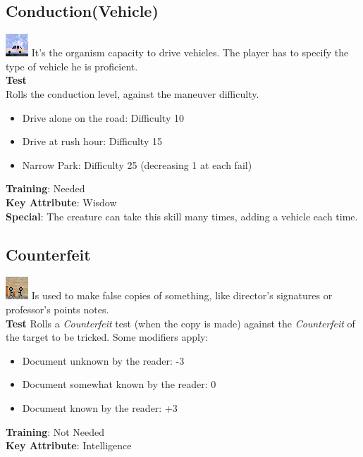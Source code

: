 \documentclass[ letterpaper,12pt]{article}
\begin{document}
\subsection{Conduction(Vehicle)}
\includegraphics{../data/skills/Img/conducao.png}
It's the organism capacity to drive vehicles. The player has to specify the type of vehicle he is proficient.\\
{\bf Test}\\
Rolls the conduction level, against the maneuver difficulty.\\
\begin{itemize}
\item{Drive alone on the road: Difficulty 10}
\item{Drive at rush hour: Difficulty 15}
\item{Narrow Park: Difficulty 25 (decreasing 1 at each fail)}
\end{itemize}
{\bf Training}: Needed\\
{\bf Key Attribute}: Wisdow\\
{\bf Special}: The creature can take this skill many times, adding a vehicle each time.

\subsection{Counterfeit}
\includegraphics{../data/skills/Img/falsificar.png}
Is used to make false copies of something, like director's signatures or professor's points notes.\\
{\bf Test}
Rolls a {\it Counterfeit} test (when the copy is made) against the {\it Counterfeit} of the target to be tricked. Some modifiers apply:\\
\begin{itemize}
\item{Document unknown by the reader: -3}
\item{Document somewhat known by the reader: 0}
\item{Document known by the reader: +3}
\end{itemize}
{\bf Training}: Not Needed\\
{\bf Key Attribute}: Intelligence\\
\end{document}
